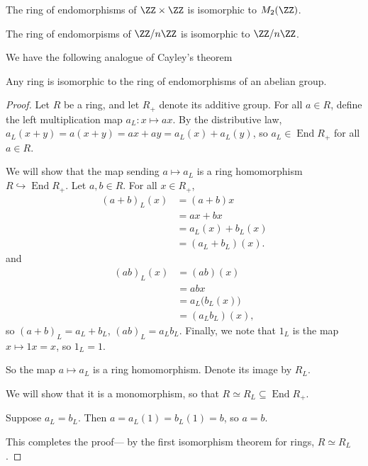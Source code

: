 \documentclass{article}
\newcommand*\isom{\ensuremath{\simeq}}
\newcommand*\End{\ensuremath{\operatorname{End}}}
\begin{document}
\begin{example}
    The ring of endomorphisms of $\ZZ \times \ZZ$ is isomorphic to $M_2(\ZZ)$.
\end{example}

\begin{example}
    The ring of endomorpisms of $\ZZ/n\ZZ$ is isomorphic to $\ZZ/n\ZZ$.
\end{example}

We have the following analogue of Cayley's theorem

\begin{theorem}
    Any ring is isomorphic to the ring of endomorphisms of an abelian group.
\end{theorem}

\begin{proof}
    Let $R$ be a ring, and let $R_+$ denote its additive group.
    For all $a \in R$, define the left multiplication map $a_L: x \mapsto ax$.
    By the distributive law, $a_L(x+y) = a(x+y) = ax + ay = a_L(x) + a_L(y)$, so $a_L \in \End R_+$ for all $a \in R$.

    We will show that the map sending $a \mapsto a_L$ is a ring homomorphism $R \hookrightarrow \End R_+$.
    Let $a, b \in R$.
    For all $x \in R_+$,
    \begin{align*}
        (a + b)_L(x) 
        &= 
        (a+b)x \\
        &= 
        ax + bx \\
        &=
        a_L(x) + b_L(x) \\
        &=
        (a_L + b_L)(x).
    \end{align*}
    and
    \begin{align*}
        (ab)_L(x) 
        &= 
        (ab)(x) \\
        &=
        abx \\
        &=
        a_L\big(b_L(x)\big) \\
        &=
        (a_Lb_L)(x),
    \end{align*}
    so $(a+b)_L = a_L + b_L$, $(ab)_L = a_Lb_L$.
    Finally, we note that $1_L$ is the map $x \mapsto 1x = x$, so $1_L = 1$.

    So the map $a \mapsto a_L$ is a ring homomorphism.
    Denote its image by $R_L$.

    We will show that it is a monomorphism, so that $R \isom R_L \subseteq \End R_+$.

    Suppose $a_L = b_L$.
    Then $a = a_L(1) = b_L(1) = b$, so $a = b$.

    This completes the proof--- by the first isomorphism theorem for rings, $R \isom R_L$.
\end{proof}
\end{document}
